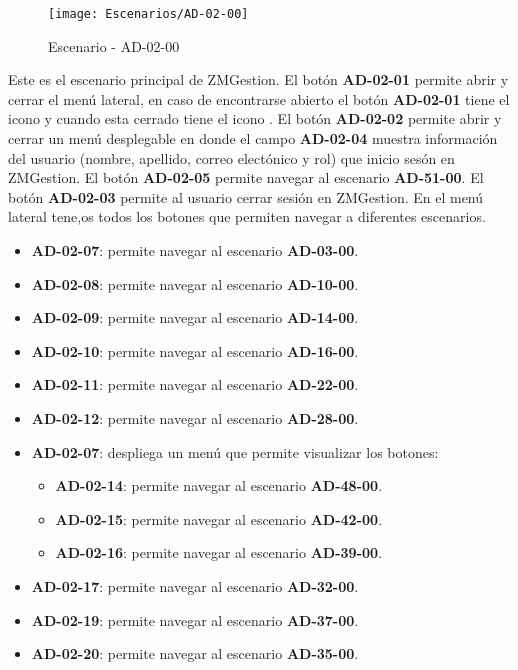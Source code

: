\begin{figure}[H]
\centering
\texttt{[image: Escenarios/AD-02-00]}
\caption{Escenario - AD-02-00}
\label{fig:AD-02-00}
\end{figure}
Este es el escenario principal de ZMGestion. El botón \textbf{AD-02-01} permite abrir y cerrar el menú lateral, en caso de encontrarse abierto el botón \textbf{AD-02-01} tiene el icono \faTimes y cuando esta cerrado tiene el icono \faBars.
El botón \textbf{AD-02-02} permite abrir y cerrar un menú desplegable en donde el campo \textbf{AD-02-04} muestra información del usuario (nombre, apellido, correo electónico y rol) que inicio sesón en ZMGestion. El botón \textbf{AD-02-05} permite navegar al escenario \textbf{AD-51-00}. 
El botón \textbf{AD-02-03} permite al usuario cerrar sesión en ZMGestion.
En el menú lateral tene,os todos los botones que permiten navegar a diferentes escenarios.
\begin{itemize}
    \item \textbf{AD-02-07}: permite navegar al escenario \textbf{AD-03-00}.
    \item \textbf{AD-02-08}: permite navegar al escenario \textbf{AD-10-00}.
    \item \textbf{AD-02-09}: permite navegar al escenario \textbf{AD-14-00}.
    \item \textbf{AD-02-10}: permite navegar al escenario \textbf{AD-16-00}.
    \item \textbf{AD-02-11}: permite navegar al escenario \textbf{AD-22-00}.
    \item \textbf{AD-02-12}: permite navegar al escenario \textbf{AD-28-00}.
    \item \textbf{AD-02-07}: despliega un menú que permite visualizar los botones:
    \begin{itemize}
        \item \textbf{AD-02-14}: permite navegar al escenario \textbf{AD-48-00}.
        \item \textbf{AD-02-15}: permite navegar al escenario \textbf{AD-42-00}. 
        \item \textbf{AD-02-16}: permite navegar al escenario \textbf{AD-39-00}.
    \end{itemize}
    \item \textbf{AD-02-17}: permite navegar al escenario \textbf{AD-32-00}.
    \item \textbf{AD-02-19}: permite navegar al escenario \textbf{AD-37-00}.
    \item \textbf{AD-02-20}: permite navegar al escenario \textbf{AD-35-00}.
\end{itemize}
\clearpage
